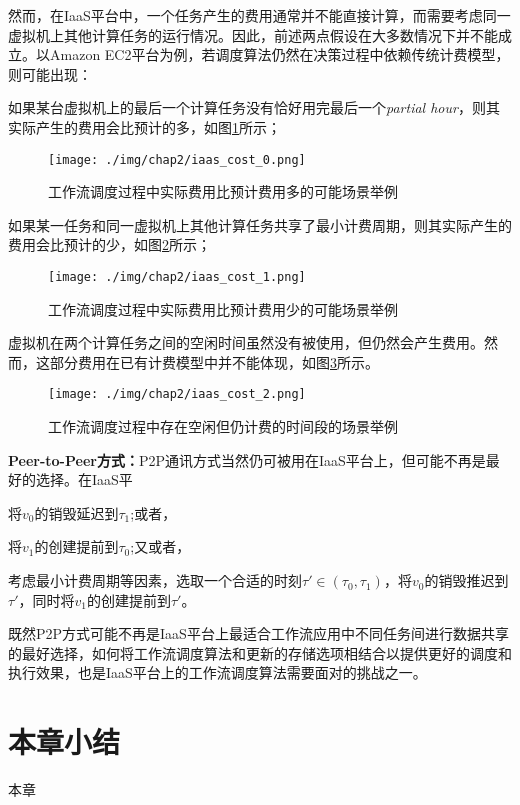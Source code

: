 然而，在IaaS平台中，一个任务产生的费用通常并不能直接计算，而需要考虑同一虚拟机上其他计算任务的运行情况。因此，前述两点假设在大多数情况下并不能成立。以Amazon EC2平台为例，若调度算法仍然在决策过程中依赖传统计费模型，则可能出现：
\begin{asparaenum}
	\item 如果某台虚拟机上的最后一个计算任务没有恰好用完最后一个\textit{partial hour}，则其实际产生的费用会比预计的多，如图\ref{fig:iaas_cost_0}所示；
	
	\begin{figure}[!h]
		\centering
		\texttt{[image: ./img/chap2/iaas\_cost\_0.png]}
		\caption{工作流调度过程中实际费用比预计费用多的可能场景举例}
		\label{fig:iaas_cost_0}
	\end{figure}
	
	\item 如果某一任务和同一虚拟机上其他计算任务共享了最小计费周期，则其实际产生的费用会比预计的少，如图\ref{fig:iaas_cost_1}所示；
	
	\begin{figure}[!h]
		\centering
		\texttt{[image: ./img/chap2/iaas\_cost\_1.png]}
		\caption{工作流调度过程中实际费用比预计费用少的可能场景举例}
		\label{fig:iaas_cost_1}
	\end{figure}
	
	\item 虚拟机在两个计算任务之间的空闲时间虽然没有被使用，但仍然会产生费用。然而，这部分费用在已有计费模型中并不能体现，如图\ref{fig:iaas_cost_2}所示。
	
	\begin{figure}[!h]
		\centering
		\texttt{[image: ./img/chap2/iaas\_cost\_2.png]}
		\caption{工作流调度过程中存在空闲但仍计费的时间段的场景举例}
		\label{fig:iaas_cost_2}
	\end{figure}
\end{asparaenum}



\begin{asparaenum}
	
	\item \textbf{Peer-to-Peer方式：}P2P通讯方式当然仍可被用在IaaS平台上，但可能不再是最好的选择。在IaaS平
	\begin{inparaenum}
		\item 将$v_0$的销毁延迟到$\tau_1$;或者，
		\item 将$v_1$的创建提前到$\tau_0$;又或者，
		\item 考虑最小计费周期等因素，选取一个合适的时刻$\tau'\in (\tau_0, \tau_1)$，将$v_0$的销毁推迟到$\tau'$，同时将$v_1$的创建提前到$\tau'$。
	\end{inparaenum}

	
\end{asparaenum}

既然P2P方式可能不再是IaaS平台上最适合工作流应用中不同任务间进行数据共享的最好选择，如何将工作流调度算法和更新的存储选项相结合以提供更好的调度和执行效果，也是IaaS平台上的工作流调度算法需要面对的挑战之一。

\section{本章小结}
本章